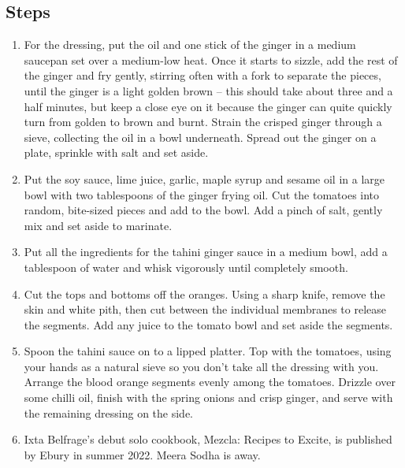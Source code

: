 \subsection*{Steps}
\begin{enumerate}
\item For the dressing, put the oil and one stick of the ginger in a medium saucepan set over a medium-low heat. Once it starts to sizzle, add the rest of the ginger and fry gently, stirring often with a fork to separate the pieces, until the ginger is a light golden brown – this should take about three and a half minutes, but keep a close eye on it because the ginger can quite quickly turn from golden to brown and burnt. Strain the crisped ginger through a sieve, collecting the oil in a bowl underneath. Spread out the ginger on a plate, sprinkle with salt and set aside.
\item Put the soy sauce, lime juice, garlic, maple syrup and sesame oil in a large bowl with two tablespoons of the ginger frying oil. Cut the tomatoes into random, bite-sized pieces and add to the bowl. Add a pinch of salt, gently mix and set aside to marinate.
\item Put all the ingredients for the tahini ginger sauce in a medium bowl, add a tablespoon of water and whisk vigorously until completely smooth.
\item Cut the tops and bottoms off the oranges. Using a sharp knife, remove the skin and white pith, then cut between the individual membranes to release the segments. Add any juice to the tomato bowl and set aside the segments.
\item Spoon the tahini sauce on to a lipped platter. Top with the tomatoes, using your hands as a natural sieve so you don’t take all the dressing with you. Arrange the blood orange segments evenly among the tomatoes. Drizzle over some chilli oil, finish with the spring onions and crisp ginger, and serve with the remaining dressing on the side.
\item  Ixta Belfrage’s debut solo cookbook, Mezcla: Recipes to Excite, is published by Ebury in summer 2022. Meera Sodha is away.
\end{enumerate}
\newpage
